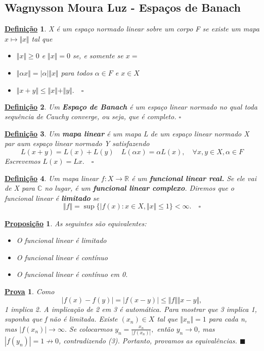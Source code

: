\documentclass{article}
\newtheorem*{def*}{\underline{Defini\c c\~ao}}
\newtheorem*{prop*}{\underline{Proposi\c c\~ao}}
\newtheorem*{proof*}{\underline{Prova}}
\renewcommand\qedsymbol{$\blacksquare$}
\begin{document}
\subsection{Wagnysson Moura Luz - Espaços de Banach}
 \begin{def*}
   X é um espaço normado linear sobre um corpo F se existe um mapa \(x\mapsto \Vert x \Vert\) tal que 
  \begin{itemize}
    \item[1)] \(\Vert x \Vert \geq 0\) e \(\Vert x \Vert = 0\) se, e somente se \(x=\)
      \item[2)] \(\Vert \alpha x \Vert = |\alpha |\Vert x \Vert\) para todos \(\alpha \in F\) e \(x\in X\)
        \item[3)] \(\Vert x + y \Vert \leq \Vert x \Vert + \Vert y \Vert. \quad \square\)
  \end{itemize}
 \end{def*}
 \begin{def*}
   Um \textbf{Espaço de Banach} é um espaço linear normado no qual toda sequência de Cauchy converge, ou seja, que é completo. \(\square\) 
 \end{def*}
\begin{def*}
  Um \textbf{mapa linear} é um mapa L de um espaço linear normado X par aum espaço linear normado Y satisfazendo 
    \[
      L(x+y) = L(x) + L(y)\quad L(\alpha x) = \alpha L(x),\quad \forall x, y\in X, \alpha \in F
    \]
  Escrevemos \(L(x) = Lx. \quad \square\)
\end{def*}
 \begin{def*}
   Um mapa linear \(f:X\rightarrow \mathbb{R}\) é um \textbf{funcional linear real.} Se ele vai de X para \(\mathbb{C}\) no lugar, é um \textbf{funcional linear complexo}. Diremos que o funcional linear é \textbf{limitado } se 
     \[
       \Vert f \Vert = \sup_{}\{|f(x):x\in X, \Vert x \Vert \leq 1\} < \infty. \quad \square
     \]
 \end{def*}
 \begin{prop*}
   As seguintes são equivalentes: 
  \begin{itemize}
    \item[1)] O funcional linear é limitado
    \item[2)] O funcional linear é contínuo
    \item[1)] O funcional linear é contínuo em 0.
  \end{itemize}
 \end{prop*}
 \begin{proof*}
   Como 
     \[
       |f(x) - f(y)| = |f(x-y)|\leq \Vert f \Vert\Vert x-y \Vert,
     \]
     1 implica 2. A implicação de 2 em 3 é automática. Para mostrar que 3 implica 1, suponha que f não é limitada. Existe \((x_{n})\in X\) tal que \(\Vert x_{n} \Vert = 1\) para cada n, mas \(|f(x_{n})|\to \infty.\) Se colocarmos \(y_{n} = \frac{x_{n}}{|f(x_{n})|},\) então \(y_{n}\to 0\), mas 
     \(|f(y_{n})| = 1\not\to 0\), contradizendo (3). Portanto, provamos as equivalências. \qedsymbol
 \end{proof*}
\end{document}
